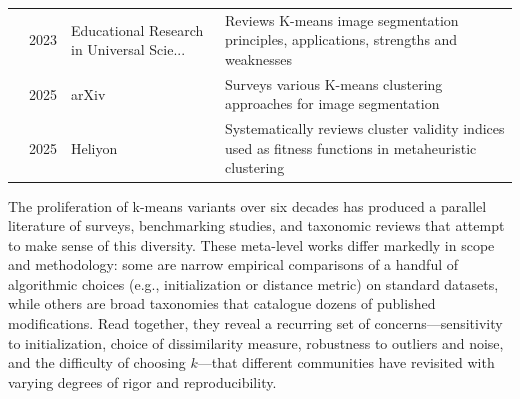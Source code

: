 \begin{table}[!t]
\begin{tabularx}{\textwidth}{@{}l c p{3.6cm} X@{}}
\cite{sattarov2023unveiling} & 2023 & Educational Research in Universal Scie... & Reviews K-means image segmentation principles, applications, strengths and weaknesses \\
\cite{mukherjee2025survey} & 2025 & arXiv & Surveys various K-means clustering approaches for image segmentation \\
\cite{ikotun2025cluster} & 2025 & Heliyon & Systematically reviews cluster validity indices used as fitness functions in metaheuristic clustering \\
\bottomrule
\end{tabularx}
\end{table}

The proliferation of k-means variants over six decades has produced a parallel literature of surveys, benchmarking studies, and taxonomic reviews that attempt to make sense of this diversity. These meta-level works differ markedly in scope and methodology: some are narrow empirical comparisons of a handful of algorithmic choices (e.g., initialization or distance metric) on standard datasets, while others are broad taxonomies that catalogue dozens of published modifications. Read together, they reveal a recurring set of concerns---sensitivity to initialization, choice of dissimilarity measure, robustness to outliers and noise, and the difficulty of choosing $k$---that different communities have revisited with varying degrees of rigor and reproducibility.

